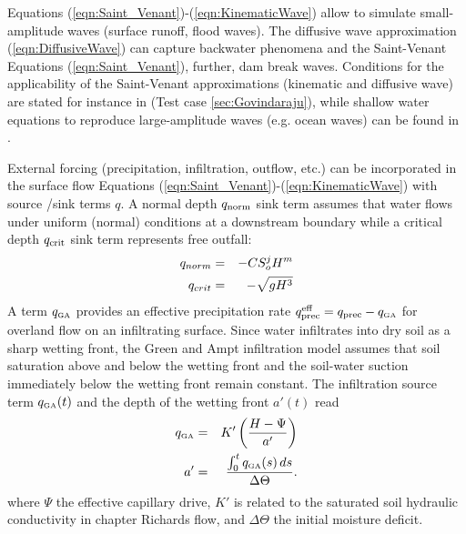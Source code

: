%
Equations (\ref{eqn:Saint_Venant})-(\ref{eqn:KinematicWave}) allow to simulate small-amplitude waves (surface runoff, flood waves).
The diffusive wave approximation (\ref{eqn:DiffusiveWave}) can capture backwater phenomena and the
Saint-Venant Equations (\ref{eqn:Saint_Venant}), further, dam break waves. 
Conditions for the applicability of the Saint-Venant approximations (kinematic and diffusive wave) 
are stated for instance in \cite{GovEtAl:88} (Test case \ref{sec:Govindaraju}), while shallow water equations to reproduce large-amplitude waves (e.g. ocean waves)
can be found in \cite{Miglio:00}.
%

%
External forcing (precipitation, infiltration, outflow, etc.) can be incorporated in the surface flow Equations (\ref{eqn:Saint_Venant})-(\ref{eqn:KinematicWave})
with source /sink terms $q$.
A normal depth $q_{\mbox{\scriptsize norm}}$ sink term assumes that water flows under uniform (normal) conditions at a downstream boundary 
while a critical depth $q_{\mbox{\scriptsize crit}}$ sink term represents free outfall:
%
\begin{eqnarray}
q_{\mbox\tiny norm} &=&- CS_o^j H^m \label{eqn:normalDepth}\\
q_{\mbox\tiny crit} &=&- \sqrt{ gH^3} \label{eqn:criticalDepth}
\end{eqnarray}
%
A \cite{Green:11} term $q_{\mbox{\tiny GA}}$ provides an effective precipitation rate
$q_{\mbox{\scriptsize prec}}^{\mbox{\scriptsize eff}} = q_{\mbox{\scriptsize prec}} - q_{\mbox{\tiny GA}}$ for overland flow on an infiltrating surface.
Since water infiltrates into dry soil as a sharp wetting front, the Green and Ampt infiltration model assumes that 
soil saturation above and below the wetting front and the soil-water suction immediately below the wetting front remain constant. 
The infiltration source term $q_{{\mbox{\tiny GA}}}(t)$ and the depth of the wetting front $a'(t)$ read
%
\begin{eqnarray}
q_{\mbox{\tiny  GA}} &=& K' \left( \frac{H - \Psi}{a'} \right) \label{eqn:OLF_Green_Ampt}\\
a' &=& \frac{\int_{0}^{t}q_{\mbox{\tiny GA}}(s)\, ds}{\Delta \Theta} .\nonumber
\end{eqnarray}
%
where $\Psi$ the effective capillary drive,  $K'$ is related to the saturated soil hydraulic conductivity in chapter Richards flow, 
and $\Delta \Theta$ the initial moisture deficit. 

%
%
%

